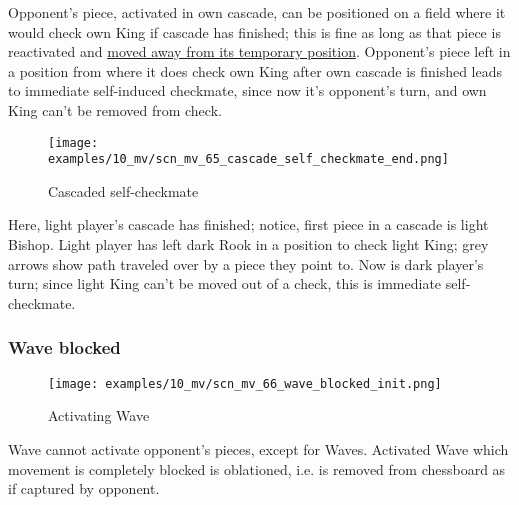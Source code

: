 \vspace*{-0.4\baselineskip}
Opponent's piece, activated in own cascade, can be positioned on a field where
it would check own King if cascade has finished; this is fine as long as that piece
is reactivated and
\hyperref[fig:scn_mv_49_cascaded_piece_check_init]{moved away from its temporary position}.
Opponent's piece left in a position from where it does check own King after own cascade
is finished leads to immediate self-induced checkmate, since now it's opponent's turn,
and own King can't be removed from check.

\clearpage %

\vspace*{-2.1\baselineskip}
\noindent
\begin{figure}[h]
\texttt{[image: examples/10\_mv/scn\_mv\_65\_cascade\_self\_checkmate\_end.png]}
\caption{Cascaded self-checkmate}
\label{fig:scn_mv_65_cascade_self_checkmate_end}
\end{figure}

Here, light player's cascade has finished; notice, first piece in a cascade is light
Bishop. Light player has left dark Rook in a position to check light King; grey arrows
show path traveled over by a piece they point to. Now is dark player's turn; since
light King can't be moved out of a check, this is immediate self-checkmate.

\clearpage %

\subsubsection*{Wave blocked}
\label{sec:Miranda's veil/Wave/Cascading opponent/Wave blocked}

\vspace*{-1.4\baselineskip}
\noindent
\begin{figure}[h]
\texttt{[image: examples/10\_mv/scn\_mv\_66\_wave\_blocked\_init.png]}
\caption{Activating Wave}
\label{fig:scn_mv_66_wave_blocked_init}
\end{figure}

Wave cannot activate opponent's pieces, except for Waves. Activated Wave which movement
is completely blocked is oblationed, i.e. is removed from chessboard as if captured by
opponent.

